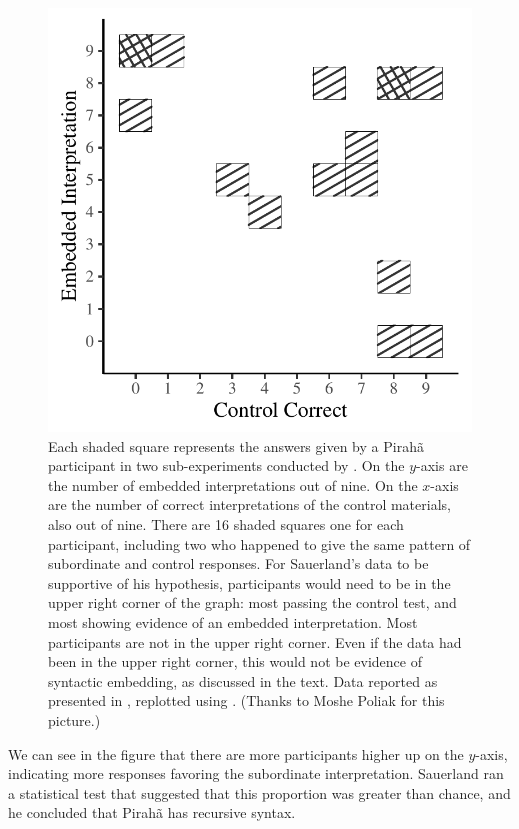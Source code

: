 \documentclass{article}
\begin{document}
\begin{figure}
    \includegraphics[width=.75\textwidth]{gibson_figure1.pdf}
    \caption{Each shaded square represents the answers given by a Pirahã participant in two sub-experiments conducted by \citet{sauerland2018false}. On the $y$-axis are the number of embedded interpretations out of nine. On the $x$-axis are the number of correct interpretations of the control materials, also out of nine. There are 16 shaded squares one for each participant, including two who happened to give the same pattern of subordinate and control responses.  \newline \newline For Sauerland's data to be supportive of his hypothesis, participants would need to be in the upper right corner of the graph:  most passing the control test, and most showing evidence of an embedded interpretation.  Most participants are not in the upper right corner. Even if the data had been in the upper right corner, this would not be evidence of syntactic embedding, as discussed in the text. \newline \newline
    Data reported as presented in \citet{sauerland2018false}, replotted using \citet{r2023, wickham2016, ggpattern2022}. (Thanks to Moshe Poliak for this picture.)}
    \label{fig:gibson:fig1}
\end{figure}

We can see in the figure that there are more participants higher up on the $y$-axis, indicating more responses favoring the subordinate interpretation. Sauerland ran a statistical test that suggested that this proportion was greater than chance, and he concluded that Pirahã has recursive syntax.
\end{document}
